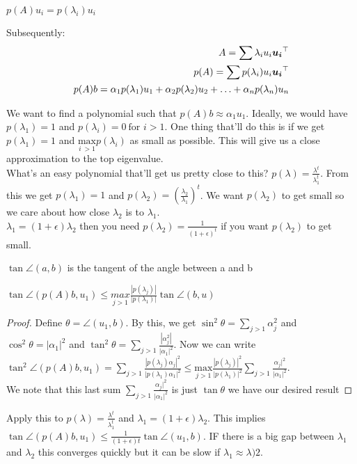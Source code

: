 \documentclass[12pt]{article}
\begin{document}
\begin{remark}
$p(A)u_i = p(\lambda_i)u_i$
\end{remark}
Subsequently:
\begin{align*}
A = \sum \lambda_i u_i {{\bm{u_i}}^\top}  \\
p(A) = \sum p(\lambda_i) u_i {{\bm{u_i}}^\top} \\
 p(A)b = \alpha_1 p(\lambda_1)u_1 + \alpha_2 p(\lambda_2) u_2 + \ldots + \alpha_n p(\lambda_n) u_n 
\end{align*}
 

We want to find a polynomial such that $p(A)b \approx \alpha_1 u_1$. Ideally, we would have \( p(\lambda_1) = 1\) and \( p(\lambda_i) = 0 \ \text{for } i > 1\). One thing that'll do this is if we get $p(\lambda_1) = 1$ and $\underset{i\ > 1}{\text{max}}p(\lambda_i)$ as small as possible. This will give us a close approximation to the top eigenvalue. \\

What's an easy polynomial that'll get us pretty close to this? $p(\lambda) = \frac{\lambda^t}{\lambda_1 ^t}$. From this we get \(p(\lambda_1) = 1\) and \(p(\lambda_2) = (\frac{\lambda_2}{\lambda_1})^t\). We want \(p(\lambda_2)\) to get small so we care about how close \(\lambda_2\) is to $\lambda_1$.\\ 
$\lambda_1 = (1 + \epsilon) \lambda_2$ then you need \(p(\lambda_2) = \frac{1}{(1+\epsilon)^t}\) if you want \(p(\lambda_2)\) to get small. 
\begin{remark}
\(\tan \angle (a,b)\) is the tangent of the angle between a and b
\end{remark}
\begin{theorem}[]
$\tan \angle(p(A)b, u_1) \leq \underset{j > 1}{max} \frac{|p(\lambda_j)|}{|p(\lambda_1)|} \tan \angle (b, u)$
\end{theorem}


\begin{proof}
Define $\theta = \angle (u_1,b)$. By this, we get $\sin ^2 \theta =  \sum_{j > 1} \alpha_j^2$ and $\cos ^2 \theta = |\alpha_1|^2$ and $\tan^2 \theta = \sum_{j > 1} \frac{|\alpha_j^2|}{|\alpha_1|^2}$. 
Now we can write $\tan^2 \angle (p(A)b, u_1) = \sum_{j>1} \frac{|p(\lambda_j)\alpha_j|^2}{|p(\lambda_1)\alpha_1|^2} \leq \underset{j>1}{\text{max}} \frac{|p(\lambda_j)|^2}{|p(\lambda_1)|^2} \sum_{j>1} \frac{\alpha_j |^2}{|\alpha_1| ^2}$. \\
We note that this last sum \( \sum_{j>1} \frac{\alpha_j |^2}{|\alpha_1| ^2}\) is just $\tan \theta$ we have our desired result
\end{proof}
Apply this to $p(\lambda) = \frac{\lambda^t}{\lambda_1^t}$ and $\lambda_1 = (1+\epsilon) \lambda_2$. This implies $\tan \angle(p(A)b, u_1) \leq \frac{1}{(1+\epsilon)t} \tan \angle(u_1, b)$. IF there is a big gap between $\lambda_1$ and $\lambda_2$ this converges quickly but it can be slow if $\lambda_1 \approx \lambda)2$.
\end{document}
